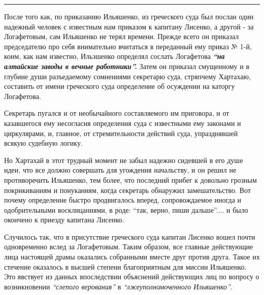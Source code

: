 \documentclass[a4paper,20pt]{report}
\begin{document}

\par\noindent\rule{\textwidth}{0.4pt}

После того как, по приказанию Ильяшенко, из греческого суда 
был послан один надежный человек с
известным нам приказом к капитану Лисенко, а другой - за Логафетовым, 
сам Ильяшенко не терял времени. Прежде всего он приказал председателю про себя
внимательно вчитаться в переданный ему приказ № 1-й,
коим, как нам известно, Ильзшенко определял сослать
Логафетова \textbf{\em ``на алтайские заводы в вечные работники''.} 
Затем он приказал смущенному и в глубине души 
разъедаемому сомнениями секретарю суда, стряпчему Хартахаю,
составить от имени греческого суда определение об осуждении на каторгу Логафетова.

Секретарь пугался и от необычайного составляемого
им приговора, и от казавшегося ему несогласия определения суда с известными
ему законами и циркулярами, и, главное, от стремительности действий суда, упразднявшей всякую судебную
логику.

Но Хартахай в этот трудный момент не забыл
надежно сидевшей в его душе идеи, что все должно совершать для угождения начальству,
и он решил не противоречить Ильяшенко, тем более, что последний прибег
к довольно грозным покрикиваниям и понуканиям, когда
секретарь обнаружил замешательство. Вот почему определение быстро продвигалось вперед,
сопровождаемое иногда и одобрительными восклицаниями, в роде: ``так, верно,
пиши дальше''.... и было окончено к приезду капитана Лисенко.

Случилось так, что в присутствие греческого суда капитан Лисенко вошел почти
одновременно вслед за Логафетовым. Таким образом, все главные действующие лица
настоящей драмы оказались собранными вместе друг против друга. Такое их
стечение оказалось в высшей степени благоприятным для миссии Ильяшенко.
Это явствует из данных впоследствии объяснений действующих лиц по вопросу о возникновении \emph{``слепого верования''}
в \emph{``лжеуполномоченного Ильяшенко''}.
\end{document}
